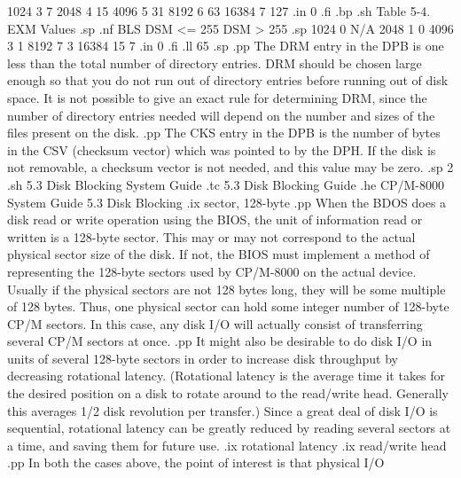                   1024          3             7
                  2048          4            15
                  4096          5            31
                  8192          6            63
                 16384          7           127
.in 0
.fi
.bp
.sh
                     Table 5-4.  EXM Values
.sp
.nf
              BLS          DSM <= 255       DSM > 255
.sp
              1024              0               N/A
              2048              1                0
              4096              3                1
              8192              7                3
             16384             15                7
.in 0
.fi
.ll 65
.sp
.pp
The DRM entry in the DPB is one less than the total number of directory
entries.  DRM should be chosen large enough so that you do not run
out of directory entries before running out of disk space.  It is not
possible to give an exact rule for determining DRM, since the number
of directory entries needed will depend on the number and sizes of the
files present on the disk.  
.pp
The CKS entry in the DPB is the number of bytes in the CSV (checksum vector)
which was pointed to by the DPH.  If the disk is not removable, a checksum
vector is not needed, and this value may be zero.
.sp 2
.sh
5.3  Disk Blocking System Guide
.tc    5.3  Disk Blocking Guide
.he CP/M-8000 System Guide                          5.3  Disk Blocking
.ix sector, 128-byte
.pp
When the BDOS does a disk read or write operation using the BIOS, the unit
of information read or written is a 128-byte sector.  This may or may not
correspond to the actual physical sector size of the disk.  If not, the BIOS
must implement a method of representing the 128-byte sectors used by CP/M-8000
on the actual device.  Usually if the physical sectors are not 128 bytes long,
they will be some multiple of 128 bytes.  Thus, one physical sector can hold
some integer number of 128-byte CP/M sectors.  In this case, any disk I/O 
will actually consist of transferring several CP/M sectors at once.  
.pp
It might also be desirable to do disk I/O in units of several 128-byte sectors
in order to increase disk throughput by decreasing rotational latency.  
(Rotational latency is the average time it takes for the desired position on 
a disk to rotate around to the read/write head.  Generally this averages 1/2
disk revolution per transfer.)  Since a great deal of disk I/O is sequential,
rotational latency can be greatly reduced by reading several sectors at a
time, and saving them for future use.
.ix rotational latency
.ix read/write head
.pp
In both the cases above, the point of interest is that physical I/O 
